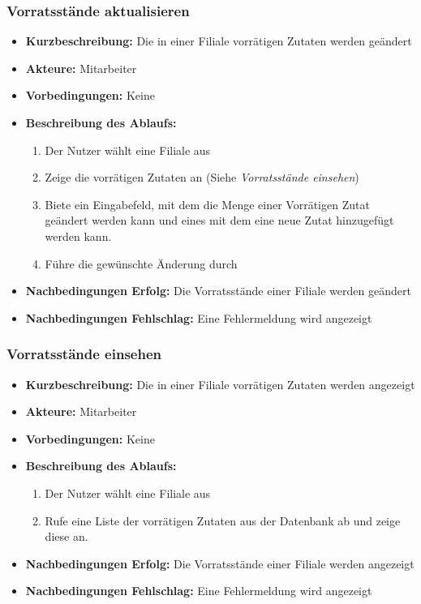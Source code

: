 \documentclass[a4paper]{report}
\begin{document}
\subsubsection*{Vorratsstände aktualisieren}
\begin{itemize}
    \item \textbf{Kurzbeschreibung:} Die in einer Filiale vorrätigen Zutaten werden geändert 
    \item \textbf{Akteure:} Mitarbeiter
    \item \textbf{Vorbedingungen:} Keine 
    \item \textbf{Beschreibung des Ablaufs:}
        \begin{enumerate}
            \item Der Nutzer wählt eine Filiale aus
            \item Zeige die vorrätigen Zutaten an (Siehe \textit{Vorratsstände einsehen})
            \item Biete ein Eingabefeld, mit dem die Menge einer Vorrätigen Zutat geändert werden kann und eines mit dem eine neue Zutat hinzugefügt werden kann.
            \item Führe die gewünschte Änderung durch
        \end{enumerate}
    \item \textbf{Nachbedingungen Erfolg:} Die Vorratsstände einer Filiale werden geändert
    \item \textbf{Nachbedingungen Fehlschlag:} Eine Fehlermeldung wird angezeigt 
\end{itemize}
%
\subsubsection*{Vorratsstände einsehen}
\begin{itemize}
    \item \textbf{Kurzbeschreibung:} Die in einer Filiale vorrätigen Zutaten werden angezeigt 
    \item \textbf{Akteure:} Mitarbeiter
    \item \textbf{Vorbedingungen:} Keine 
    \item \textbf{Beschreibung des Ablaufs:}
        \begin{enumerate}
            \item Der Nutzer wählt eine Filiale aus
            \item Rufe eine Liste der vorrätigen Zutaten aus der Datenbank ab und zeige diese an.    
        \end{enumerate}
    \item \textbf{Nachbedingungen Erfolg:} Die Vorratsstände einer Filiale werden angezeigt
    \item \textbf{Nachbedingungen Fehlschlag:} Eine Fehlermeldung wird angezeigt 
\end{itemize}
%
\end{document}
